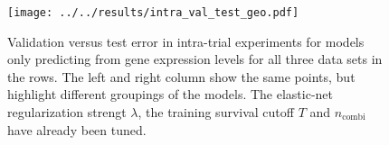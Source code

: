 \begin{figure}
    \centering
    \texttt{[image: ../../results/intra\_val\_test\_geo.pdf]}
    \caption{Validation versus test error in intra-trial experiments for models only predicting 
        from gene expression levels for all 
        three data sets in the rows. The left and right column show the same points, but highlight 
        different groupings of the models. The elastic-net regularization strengt $\lambda$, the 
        training survival cutoff $T$ and $n_\text{combi}$ have already been tuned.}
    \label{fig:intra-val-test-geo}
\end{figure}
